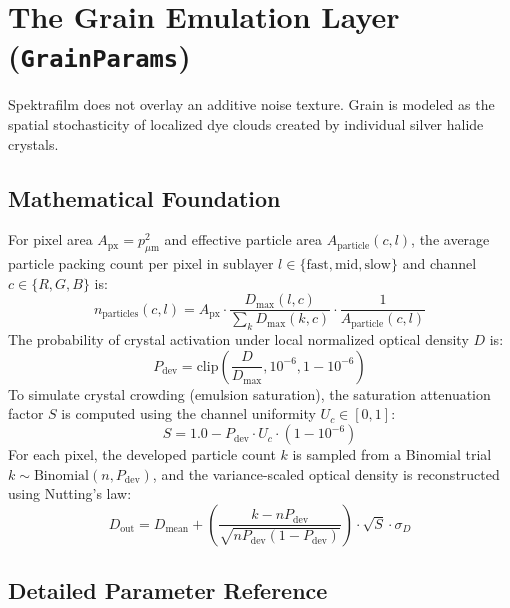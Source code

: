 \documentclass[11pt,a4paper]{article}
\begin{document}
\section{The Grain Emulation Layer (\texttt{GrainParams})}

Spektrafilm does not overlay an additive noise texture. Grain is modeled as the spatial stochasticity of localized dye clouds created by individual silver halide crystals.

\subsection{Mathematical Foundation}
For pixel area $A_{\text{px}} = p_{\mu\text{m}}^2$ and effective particle area $A_{\text{particle}}(c, l)$, the average particle packing count per pixel in sublayer $l \in \{\text{fast}, \text{mid}, \text{slow}\}$ and channel $c \in \{R, G, B\}$ is:
\begin{equation}
n_{\text{particles}}(c, l) = A_{\text{px}} \cdot \frac{D_{\max}(l, c)}{\sum_k D_{\max}(k, c)} \cdot \frac{1}{A_{\text{particle}}(c, l)}
\end{equation}
The probability of crystal activation under local normalized optical density $D$ is:
\begin{equation}
P_{\text{dev}} = \mathrm{clip}\left(\frac{D}{D_{\max}}, 10^{-6}, 1 - 10^{-6}\right)
\end{equation}
To simulate crystal crowding (emulsion saturation), the saturation attenuation factor $S$ is computed using the channel uniformity $U_c \in [0, 1]$:
\begin{equation}
S = 1.0 - P_{\text{dev}} \cdot U_c \cdot (1 - 10^{-6})
\end{equation}
For each pixel, the developed particle count $k$ is sampled from a Binomial trial $k \sim \mathrm{Binomial}(n, P_{\text{dev}})$, and the variance-scaled optical density is reconstructed using Nutting's law:
\begin{equation}
D_{\text{out}} = D_{\text{mean}} + \left(\frac{k - n P_{\text{dev}}}{\sqrt{n P_{\text{dev}} (1 - P_{\text{dev}})}}\right) \cdot \sqrt{S} \cdot \sigma_D
\end{equation}

\subsection{Detailed Parameter Reference}
\end{document}
